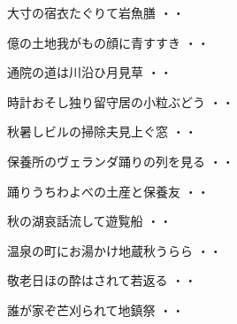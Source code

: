 \vspace{0.6cm}
\begin{shiika}大寸の宿衣たぐりて岩魚膳
\hfill{・・}\end{shiika}
\vspace{0.6cm}
\begin{shiika}億の土地我がもの顔に青すすき
\hfill{・・}\end{shiika}
\vspace{0.6cm}
\begin{shiika}通院の道は川沿ひ月見草
\hfill{・・}\end{shiika}
\vspace{0.6cm}
\begin{shiika}時計おそし独り留守居の小粒ぶどう
\hfill{・・}\end{shiika}
\vspace{0.6cm}
\begin{shiika}秋暑しビルの掃除夫見上ぐ窓
\hfill{・・}\end{shiika}
\vspace{0.6cm}
\begin{shiika}保養所のヴェランダ踊りの列を見る
\hfill{・・}\end{shiika}
\vspace{0.6cm}
\begin{shiika}踊りうちわよべの土産と保養友
\hfill{・・}\end{shiika}
\vspace{0.6cm}
\begin{shiika}秋の湖哀話流して遊覧船
\hfill{・・}\end{shiika}
\vspace{0.6cm}
\begin{shiika}温泉の町にお湯かけ地蔵秋うらら
\hfill{・・}\end{shiika}
\vspace{0.6cm}
\begin{shiika}敬老日ほの酔はされて若返る
\hfill{・・}\end{shiika}
\vspace{0.6cm}
\begin{shiika}誰が家ぞ芒刈られて地鎮祭
\hfill{・・}\end{shiika}

